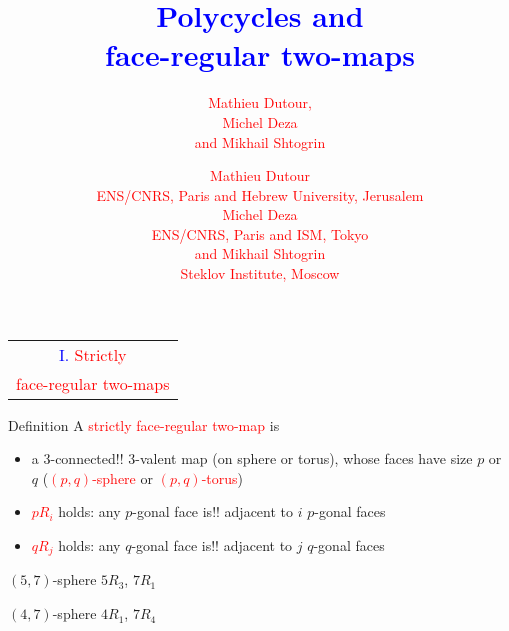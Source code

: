 \documentclass[%
pdf,
colorBG,
slideColor,
]{prosper}
\title{\Huge \textcolor{blue}{Polycycles and}\\[3mm]
\textcolor{blue}{face-regular two-maps}}
\author{
\textcolor{red}{\Large Mathieu Dutour,}\\[2mm]
\textcolor{red}{\Large Michel Deza}\\[2mm]
\textcolor{red}{\Large and Mikhail Shtogrin}\\
}
\author{
\textcolor{red}{\Large Mathieu Dutour}\\[2mm]
\textcolor{red}{\large ENS/CNRS, Paris and Hebrew University, Jerusalem}\\[2mm]
\textcolor{red}{\Large Michel Deza}\\[2mm]
\textcolor{red}{\large ENS/CNRS, Paris and ISM, Tokyo}\\[2mm]
\textcolor{red}{\Large and Mikhail Shtogrin}\\[2mm]
\textcolor{red}{\large Steklov Institute, Moscow}
}
\date{}
\begin{document}
\maketitle

















\begin{slide}{}
\begin{center}
{\Huge 
\begin{tabular*}{9cm}{c}
\\[-0.5cm]
\textcolor{blue}{I. }\textcolor{red}{Strictly}\\
\textcolor{red}{face-regular two-maps}
\end{tabular*}
}
\end{center}
\end{slide}




\begin{slide}{Definition}
\vspace{-3mm}
A \textcolor{red}{strictly face-regular two-map} is 
\begin{itemize}
\item a $3$-connected!! $3$-valent map (on sphere or torus), whose faces 
have size $p$ 
or $q$ (\textcolor{red}{$(p,q)$-sphere} or \textcolor{red}{$(p,q)$-torus})
\item \textcolor{red}{$pR_i$} holds: any $p$-gonal face is!! 
adjacent to $i$ $p$-gonal faces
\item \textcolor{red}{$qR_j$} holds: any $q$-gonal face is!!
adjacent to $j$ $q$-gonal faces
\end{itemize}

\begin{center}
\begin{minipage}{4.7cm}
\centering
{}\par
$(5,7)$-sphere $5R_3$, $7R_1$
\end{minipage}
\begin{minipage}{4.7cm}
\centering
{}\par
$(4,7)$-sphere $4R_1$, $7R_4$
\end{minipage}

\end{center}
\end{slide}
\end{document}
